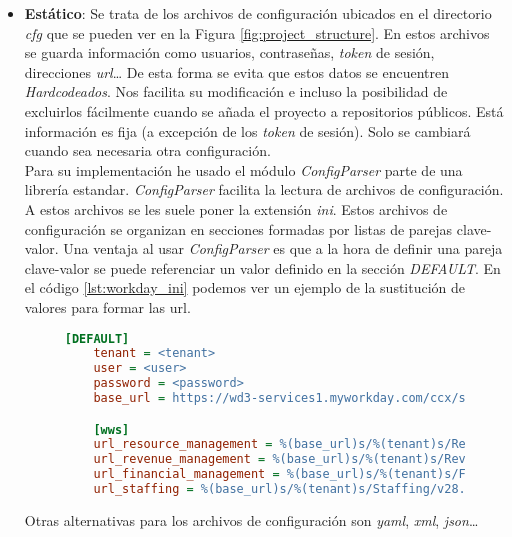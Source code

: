 \begin{itemize}[leftmargin=*]
\item \textbf{Estático}: Se trata de los archivos de configuración ubicados en el directorio \textit{cfg} que se pueden ver en la Figura \ref{fig:project_structure}.
En estos archivos se guarda información como usuarios, contraseñas, \textit{token} de sesión, direcciones \textit{url}\ldots
De esta forma se evita que estos datos se encuentren \textit{Hardcodeados}. Nos facilita su modificación e
incluso la posibilidad de excluirlos fácilmente cuando se añada el proyecto a repositorios públicos.
Está información es fija (a excepción de los \textit{token} de sesión). Solo se cambiará cuando sea necesaria otra configuración.\\

Para su implementación he usado el módulo \textit{ConfigParser} parte de una librería estandar. \textit{ConfigParser} facilita la lectura de archivos de configuración. A estos archivos se les suele poner la extensión \textit{ini}. %
Estos archivos de configuración se organizan en secciones formadas por listas de parejas clave-valor.
Una ventaja al usar \textit{ConfigParser} es que a la hora de definir una pareja clave-valor se puede referenciar un valor definido en la sección \textit{DEFAULT}. 
En el código \ref{lst:workday_ini} podemos ver un ejemplo de la sustitución de valores para formar las url.

\begin{figure}
\begin{lstlisting}[caption={Archivo de configuración workday.ini},label={lst:workday_ini}, language={INI}, breaklines]
	[DEFAULT]
	tenant = <tenant>
	user = <user>
	password = <password>
	base_url = https://wd3-services1.myworkday.com/ccx/service

	[wws]
	url_resource_management = %(base_url)s/%(tenant)s/Resource_Management/v28.0
	url_revenue_management = %(base_url)s/%(tenant)s/Revenue_Management/v28.0
	url_financial_management = %(base_url)s/%(tenant)s/Financial_Management/v28.0
	url_staffing = %(base_url)s/%(tenant)s/Staffing/v28.0
\end{lstlisting}
\end{figure}


Otras alternativas para los archivos de configuración son \textit{yaml}, \textit{xml}, \textit{json}\ldots



\end{itemize}
